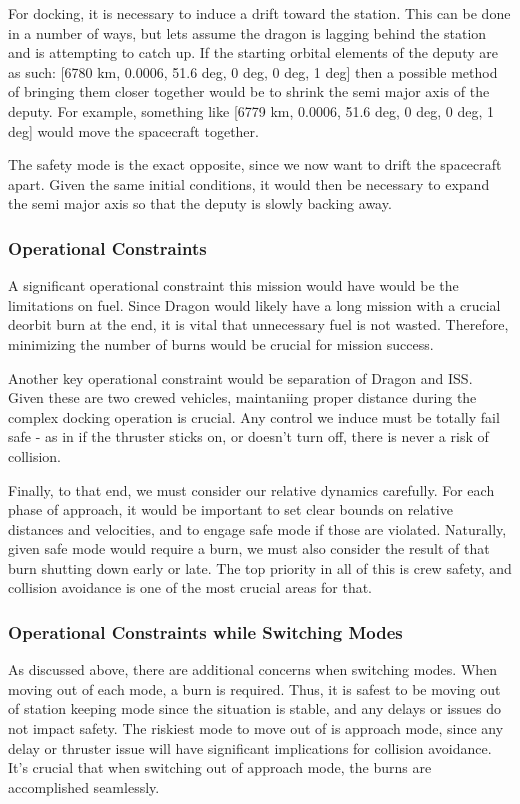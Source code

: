 For docking, it is necessary to induce a drift toward the station. This can be done in a number of ways, but lets assume the dragon is lagging behind the station and is attempting to catch up. If the starting orbital elements of the deputy are as such: [6780 km, 0.0006, 51.6 deg, 0 deg, 0 deg, 1 deg] then a possible method of bringing them closer together would be to shrink the semi major axis of the deputy. For example, something like [6779 km, 0.0006, 51.6 deg, 0 deg, 0 deg, 1 deg] would move the spacecraft together.

The safety mode is the exact opposite, since we now want to drift the spacecraft apart. Given the same initial conditions, it would then be necessary to expand the semi major axis so that the deputy is slowly backing away.

\subsubsection{Operational Constraints}
A significant operational constraint this mission would have would be the limitations on fuel. Since Dragon would likely have a long mission with a crucial deorbit burn at the end, it is vital that unnecessary fuel is not wasted. Therefore, minimizing the number of burns would be crucial for mission success.

Another key operational constraint would be separation of Dragon and ISS. Given these are two crewed vehicles, maintaniing proper distance during the complex docking operation is crucial. Any control we induce must be totally fail safe - as in if the thruster sticks on, or doesn't turn off, there is never a risk of collision.

Finally, to that end, we must consider our relative dynamics carefully. For each phase of approach, it would be important to set clear bounds on relative distances and velocities, and to engage safe mode if those are violated. Naturally, given safe mode would require a burn, we must also consider the result of that burn shutting down early or late. The top priority in all of this is crew safety, and collision avoidance is one of the most crucial areas for that.

\subsubsection{Operational Constraints while Switching Modes}
As discussed above, there are additional concerns when switching modes. When moving out of each mode, a burn is required. Thus, it is safest to be moving out of station keeping mode since the situation is stable, and any delays or issues do not impact safety. The riskiest mode to move out of is approach mode, since any delay or thruster issue will have significant implications for collision avoidance. It's crucial that when switching out of approach mode, the burns are accomplished seamlessly.

